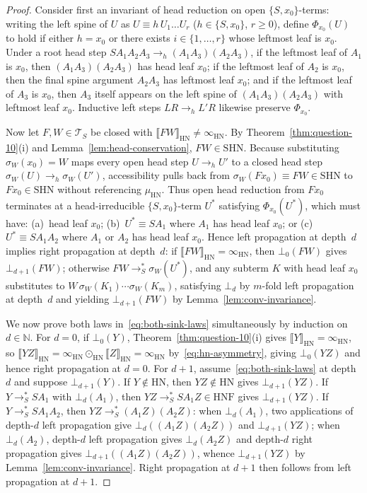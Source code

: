 \documentclass[11pt,reqno]{amsart}
\numberwithin{equation}{section}
\theoremstyle{plain}
\theoremstyle{definition}
\theoremstyle{remark}
\newcommand{\TS}{\mathcal{T}_S}
\newcommand{\HNF}{\mathrm{HNF}}
\newcommand{\HN}{\mathrm{HN}}
\newcommand{\sem}[1]{\llbracket #1 \rrbracket}
\newcommand{\redSs}{\to_S^*}
\begin{document}
\begin{proof}
Consider first an invariant of head reduction on open $\{S, x_0\}$-terms: writing the left spine of $U$ as $U \equiv h\,U_1 \dots U_r$ ($h \in \{S, x_0\}$, $r \ge 0$), define $\Phi_{x_0}(U)$ to hold if either $h = x_0$ or there exists $i \in \{1, \dots, r\}$ whose leftmost leaf is $x_0$. Under a root head step $S A_1 A_2 A_3 \to_h (A_1 A_3)(A_2 A_3)$, if the leftmost leaf of $A_1$ is $x_0$, then $(A_1 A_3)(A_2 A_3)$ has head leaf $x_0$; if the leftmost leaf of $A_2$ is $x_0$, then the final spine argument $A_2 A_3$ has leftmost leaf $x_0$; and if the leftmost leaf of $A_3$ is $x_0$, then $A_3$ itself appears on the left spine of $(A_1 A_3)(A_2 A_3)$ with leftmost leaf $x_0$. Inductive left steps $L R \to_h L' R$ likewise preserve $\Phi_{x_0}$.

Now let $F, W \in \TS$ be closed with $\sem{F W}_{\HN} \neq \infty_{\HN}$. By Theorem~\ref{thm:question-10}(i) and Lemma~\ref{lem:head-conservation}, $F W \in \mathrm{SHN}$. Because substituting $\sigma_W(x_0) = W$ maps every open head step $U \to_h U'$ to a closed head step $\sigma_W(U) \to_h \sigma_W(U')$, accessibility pulls back from $\sigma_W(F x_0) \equiv F W \in \mathrm{SHN}$ to $F x_0 \in \mathrm{SHN}$ without referencing $\mu_{\HN}$. Thus open head reduction from $F x_0$ terminates at a head-irreducible $\{S, x_0\}$-term $U^*$ satisfying $\Phi_{x_0}(U^*)$, which must have: (a)~head leaf $x_0$; (b)~$U^* \equiv S A_1$ where $A_1$ has head leaf $x_0$; or (c)~$U^* \equiv S A_1 A_2$ where $A_1$ or $A_2$ has head leaf $x_0$. Hence left propagation at depth~$d$ implies right propagation at depth~$d$: if $\sem{F W}_{\HN} = \infty_{\HN}$, then $\bot_0(F W)$ gives $\bot_{d+1}(F W)$; otherwise $F W \redSs \sigma_W(U^*)$, and any subterm $K$ with head leaf $x_0$ substitutes to $W\,\sigma_W(K_1)\cdots\sigma_W(K_m)$, satisfying $\bot_d$ by $m$-fold left propagation at depth~$d$ and yielding $\bot_{d+1}(F W)$ by Lemma~\ref{lem:conv-invariance}.

We now prove both laws in~\eqref{eq:both-sink-laws} simultaneously by induction on $d \in \mathbb{N}$. For $d = 0$, if $\bot_0(Y)$, Theorem~\ref{thm:question-10}(i) gives $\sem{Y}_{\HN} = \infty_{\HN}$, so $\sem{Y Z}_{\HN} = \infty_{\HN} \odot_{\HN} \sem{Z}_{\HN} = \infty_{\HN}$ by~\eqref{eq:hn-asymmetry}, giving $\bot_0(Y Z)$ and hence right propagation at $d = 0$. For $d + 1$, assume~\eqref{eq:both-sink-laws} at depth~$d$ and suppose $\bot_{d+1}(Y)$. If $Y \notin \HN$, then $Y Z \notin \HN$ gives $\bot_{d+1}(Y Z)$. If $Y \redSs S A_1$ with $\bot_d(A_1)$, then $Y Z \redSs S A_1 Z \in \HNF$ gives $\bot_{d+1}(Y Z)$. If $Y \redSs S A_1 A_2$, then $Y Z \redSs (A_1 Z)(A_2 Z)$: when $\bot_d(A_1)$, two applications of depth-$d$ left propagation give $\bot_d((A_1 Z)(A_2 Z))$ and $\bot_{d+1}(Y Z)$; when $\bot_d(A_2)$, depth-$d$ left propagation gives $\bot_d(A_2 Z)$ and depth-$d$ right propagation gives $\bot_{d+1}((A_1 Z)(A_2 Z))$, whence $\bot_{d+1}(Y Z)$ by Lemma~\ref{lem:conv-invariance}. Right propagation at $d + 1$ then follows from left propagation at $d + 1$.
\end{proof}
\end{document}
